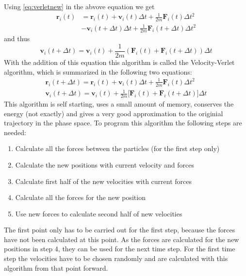 \documentclass[12pt]{article}
\begin{document}
Using \eqref{eq:verletnew} in the abvove equation we get
\begin{equation}
    \begin{aligned}
        \mathbf{r}_i(t) &= \mathbf{r}_i(t) + \mathbf{v}_i(t) \Delta t + \frac1{2m}\mathbf{F}_i(t)\Delta t^2 \\
                     &- \mathbf{v}_i(t+\Delta t) \Delta t + \frac1{2m} \mathbf{F}_i(t+\Delta t) \Delta t^2
    \end{aligned}
\end{equation}
and thus
\begin{equation}
    \label{eq:vvelocities}
    \mathbf{v}_i(t+\Delta t) = \mathbf{v}_i(t) + \frac1{2m} \left(\mathbf{F}_i(t) + \mathbf{F}_i(t+\Delta t)\right) \Delta t
\end{equation}
With the addition of this equation this algorithm is called the Velocity-Verlet algorithm, which is summarized in the following two equations:
\begin{equation}
    \label{eq:velocityverlet}
    \begin{aligned}
        \mathbf{r}_i(t+\Delta t) = \mathbf{r}_i(t) + {\mathbf{v}}_i(t) \Delta t + \frac1{2m} {\mathbf{F}}_i(t) \Delta t^2\\
        \mathbf{v}_i(t+\Delta t) = \mathbf{v}_i(t) + \frac1{2m} \Big[\mathbf{F}_i(t) + \mathbf{F}_i(t+\Delta t)\Big] \Delta t
    \end{aligned}
\end{equation}
This algorithm is self starting, uses a small amount of memory, conserves the energy (not exactly) 
and gives a very good approximation to the originial trajectory
in the phase space. To program this algorithm the following steps are needed: 
\begin{enumerate}
    \item Calculate all the forces between the particles (for the first step only)
    \item Calculate the new positions with current velocity and forces
    \item Calculate first half of the new velocities with current forces
    \item Calculate all the forces for the new position
    \item Use new forces to calculate second half of new velocities
\end{enumerate}
The first point only has to be carried out for the first step, because the forces have not been calculated at this point. As the forces are calculated
for the new positions in step 4, they can be used for the next time step. For the first time step the velocities have to be chosen randomly and are 
calculated with this algorithm from that point forward.
\end{document}
